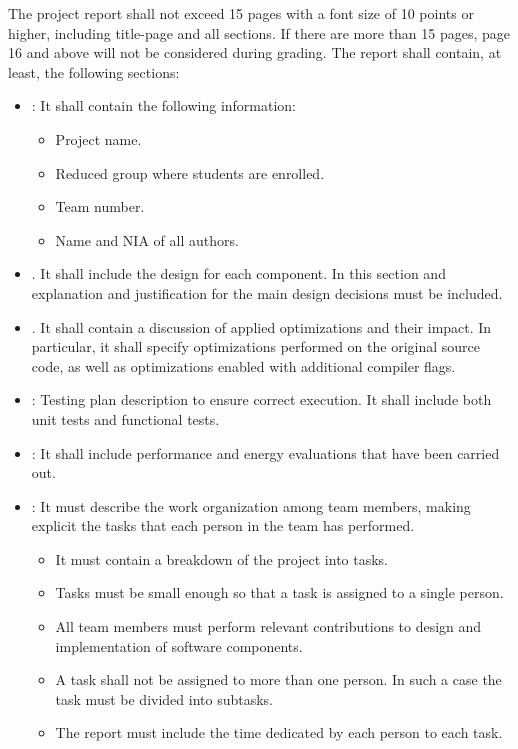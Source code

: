 The project report shall not exceed 15 pages with a font size of 10 points
or higher, including title-page and all sections. If there are more than
15 pages, page 16 and above will not be considered during grading.
The report shall contain, at least, the following sections:

\begin{itemize}

\item {}: It shall contain the following information:
  \begin{itemize}
    \item Project name.
    \item Reduced group where students are enrolled.
    \item Team number.
    \item Name and NIA of all authors.
  \end{itemize}

\item {}. 
      It shall include the design for each component.
      In this section and explanation and justification for the main
      design decisions must be included.

\item {}. 
      It shall contain a discussion of applied optimizations and their
      impact. In particular, it shall specify optimizations performed
      on the original source code, as well as optimizations enabled
      with additional compiler flags.

\item {}: 
      Testing plan description to ensure correct execution.
      It shall include both unit tests and functional tests.

\item {}:
      It shall include performance and energy evaluations that have been
      carried out.

\item {}:
      It must describe the work organization among team members, 
      making explicit the tasks that each person in the team has performed.
        \begin{itemize}
          \item It must contain a breakdown of the project into tasks.
          \item Tasks must be small enough so that a task is assigned to
                a single person.
          \item All team members must perform relevant contributions to design
                and implementation of software components.
          \item A task shall not be assigned to more than one person.
                In such a case the task must be divided into subtasks.
          \item The report must include the time dedicated by each person to each task.
        \end{itemize}


\end{itemize}
